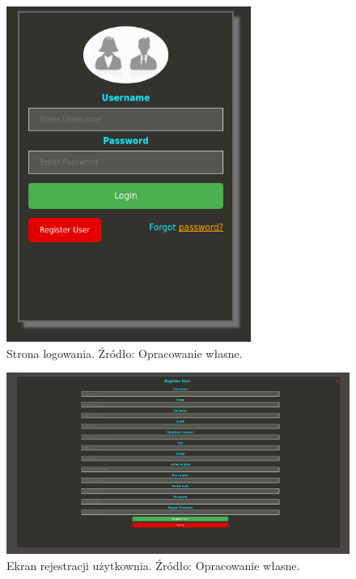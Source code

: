 \begin{figure}[H]
	\centering
	\includegraphics[width=8cm]{img/software/website/login_window.png}
	\caption{Strona logowania. Źródło: Opracowanie własne.}
	\label{fig:image_soft_website_login}
\end{figure}

\begin{figure}[H]
	\centering
	\includegraphics[width=17cm]{img/software/website/register_user.png}
	\caption{Ekran rejestracji użytkownia. Źródło: Opracowanie własne.}
	\label{fig:image_soft_website_register_user}
\end{figure}

